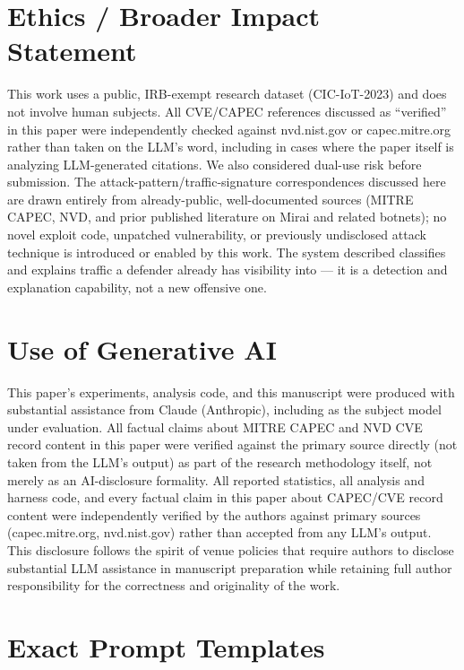 \documentclass[10pt,twocolumn]{article}
\begin{document}
\section*{Ethics / Broader Impact Statement}

This work uses a public, IRB-exempt research dataset (CIC-IoT-2023) and does not involve human subjects. All CVE/CAPEC references discussed as ``verified'' in this paper were independently checked against nvd.nist.gov or capec.mitre.org rather than taken on the LLM's word, including in cases where the paper itself is analyzing LLM-generated citations. We also considered dual-use risk before submission. The attack-pattern/traffic-signature correspondences discussed here are drawn entirely from already-public, well-documented sources (MITRE CAPEC, NVD, and prior published literature on Mirai and related botnets); no novel exploit code, unpatched vulnerability, or previously undisclosed attack technique is introduced or enabled by this work. The system described classifies and explains traffic a defender already has visibility into --- it is a detection and explanation capability, not a new offensive one.

\section*{Use of Generative AI}

This paper's experiments, analysis code, and this manuscript were produced with substantial assistance from Claude (Anthropic), including as the subject model under evaluation. All factual claims about MITRE CAPEC and NVD CVE record content in this paper were verified against the primary source directly (not taken from the LLM's output) as part of the research methodology itself, not merely as an AI-disclosure formality. All reported statistics, all analysis and harness code, and every factual claim in this paper about CAPEC/CVE record content were independently verified by the authors against primary sources (capec.mitre.org, nvd.nist.gov) rather than accepted from any LLM's output. This disclosure follows the spirit of venue policies that require authors to disclose substantial LLM assistance in manuscript preparation while retaining full author responsibility for the correctness and originality of the work.

\appendix

\section{Exact Prompt Templates}
\label{app:prompts}
\end{document}
